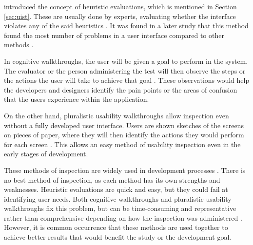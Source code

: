             \citet{nielsen1990heuristic} introduced the concept of heuristic evaluations, which is mentioned in Section \ref{sec:uist}. These are usually done by experts, evaluating whether the interface violates any of the said heuristics \citep{hollingsed2007usability}. It was found in a later study that this method found the most number of problems in a user interface compared to other methods \citep{jeffries1991user}.
            
            In cognitive walkthroughs, the user will be given a goal to perform in the system. The evaluator or the person administering the test will then observe the steps or the actions the user will take to achieve that goal \citep{hollingsed2007usability}. These observations would help the developers and designers identify the pain points or the areas of confusion that the users experience within the application. 
            
            On the other hand, pluralistic usability walkthroughs allow inspection even without a fully developed user interface. Users are shown sketches of the screens on pieces of paper, where they will then identify the actions they would perform for each screen \citep{hollingsed2007usability}. This allows an easy method of usability inspection even in the early stages of development.
            
            These methods of inspection are widely used in development processes \citep{hollingsed2007usability}. There is no best method of inspection, as each method has its own strengths and weaknesses. Heuristic evaluations are quick and easy, but they could fail at identifying user needs. Both cognitive walkthroughs and pluralistic usability walkthroughs fix this problem, but can be time-consuming and representative rather than comprehensive depending on how the inspection was administered \citep{hollingsed2007usability}. However, it is common occurrence that these methods are used together to achieve better results that would benefit the study or the development goal.
            
